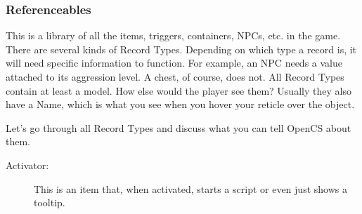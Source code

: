 \subsubsection{Referenceables}

This is a library of all the items, triggers, containers, NPCs, etc. in the game. There are several kinds of Record Types. Depending on which type a record is, it will need specific information to function. For example, an NPC needs a value attached to its aggression level. A chest, of course, does not. All Record Types contain at least a model. How else would the player see them? Usually they also have a Name, which is what you see when you hover your reticle  over the object.

Let's go through all Record Types and discuss what you can tell OpenCS about them.

\begin{description}
 \item[Activator:] This is an item that, when activated, starts a script or even just shows a tooltip.
\end{description}
